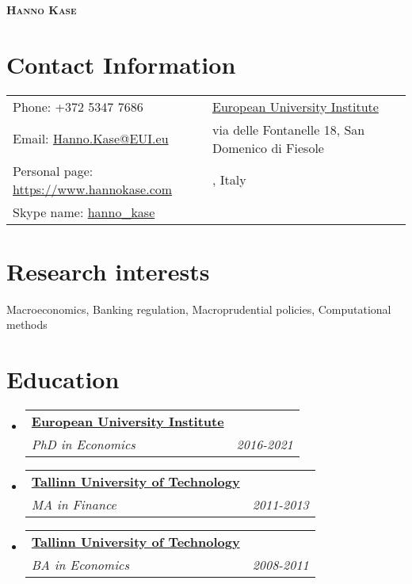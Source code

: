 \documentclass[a4, 11pt]{article}
\makeatletter
\newcommand{\resumeSubheading}[4]{
      \vspace{-2pt}\item
        \begin{tabular*}{0.97\textwidth}[t]{l@{\extracolsep{\fill}}r}
          \textbf{#1} & #2 \\
          \textit{\small#3} & \textit{\small #4} \\
        \end{tabular*}
    }
\newcommand{\resumeSubHeadingListStart}{\begin{itemize}[leftmargin=0.15in, label={}]}
\newcommand{\resumeSubHeadingListEnd}{\end{itemize}}
\makeatother
\begin{document}
    \begin{center}
        \textbf{\Huge \scshape Hanno Kase} \\ \vspace{1pt}
    \end{center}


    \section*{Contact Information}
    \begin{table}[H]
      \begin{tabular}{>{\raggedright\arraybackslash}p{0.5\linewidth}>{\raggedleft\arraybackslash}p{0.5\linewidth}}Phone: +372 5347 7686 &\href{https://www.eui.eu/}{European University Institute}\\
          Email: \href{mailto:Hanno.Kase@EUI.eu}{Hanno.Kase@EUI.eu}
        & via delle Fontanelle 18, San Domenico di Fiesole\\
        Personal page: \href{https://www.hannokase.com}{https://www.hannokase.com} & 50014, Italy\\
        Skype name: \href{skype:hanno\_kase?call}{hanno\_kase} &
      \end{tabular}
    \end{table}

    \section{Research interests}Macroeconomics, Banking regulation, Macroprudential policies, Computational methods

    \section{Education}\resumeSubHeadingListStart
          \resumeSubheading
            {\href{https://www.eui.eu}{European University Institute} }
            {}
            {PhD in Economics}
            { 2016-2021 }
          \resumeSubheading
            {\href{https://www.ttu.ee/en}{Tallinn University of Technology} }
            {}
            {MA in Finance}
            { 2011-2013 }
          \resumeSubheading
            {\href{https://www.ttu.ee/en}{Tallinn University of Technology} }
            {}
            {BA in Economics}
            { 2008-2011 }
      \resumeSubHeadingListEnd

\end{document}

